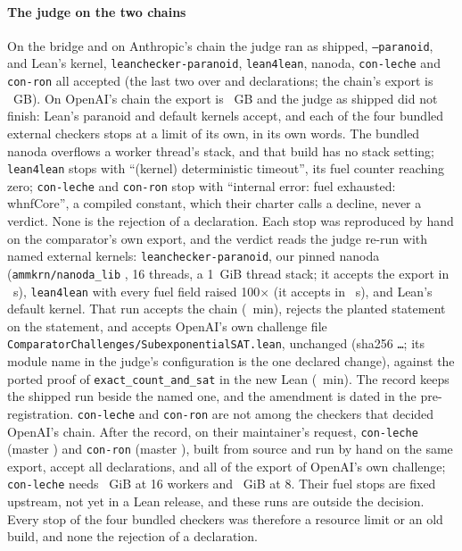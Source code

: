 \documentclass[preprint,11pt,authoryear,a4paper]{elsarticle}
\newcommand{\lean}[1]{\texttt{#1}}
\begin{document}
\paragraph{The judge on the two chains} On the bridge and on Anthropic's chain the judge ran as shipped, \lean{--paranoid}, and Lean's kernel, \lean{leanchecker-paranoid}, \lean{lean4lean}, nanoda, \lean{con-leche} and \lean{con-ron} all accepted (the last two over \EcCtwoJudgeDecls{} and \EcChainJudgeDecls{} declarations; the chain's export is \EcExportGb{}~GB). On OpenAI's chain the export is \EcOaExportGb{}~GB and the judge as shipped did not finish: Lean's paranoid and default kernels accept, and each of the four bundled external checkers stops at a limit of its own, in its own words. The bundled nanoda \EcOaBundledNanoda{} overflows a worker thread's stack, and that build has no stack setting; \lean{lean4lean} stops with ``(kernel) deterministic timeout'', its fuel counter reaching zero; \lean{con-leche} and \lean{con-ron} stop with ``internal error: fuel exhausted: whnfCore'', a compiled constant, which their charter calls a decline, never a verdict. None is the rejection of a declaration. Each stop was reproduced by hand on the comparator's own export, and the verdict reads the judge re-run with named external kernels: \lean{leanchecker-paranoid}, our pinned nanoda (\lean{ammkrn/nanoda\_lib} \EcPinnedNanoda, 16 threads, a 1~GiB thread stack; it accepts the export in \EcOaNanodaPinnedSec{}~s), \lean{lean4lean} with every fuel field raised 100$\times$ (it accepts in \EcOaLeanFourLeanFuelSec{}~s), and Lean's default kernel. That run accepts the chain (\EcOaJudgeMin{}~min), rejects the planted statement on the statement, and accepts OpenAI's own challenge file \lean{ComparatorChallenges/SubexponentialSAT.lean}, unchanged (sha256 \texttt{\EcOaChallengeSha\dots}; its module name in the judge's configuration is the one declared change), against the ported proof of \lean{exact\_count\_and\_sat} in the new Lean (\EcOaPthreeMin{}~min). The record keeps the shipped run beside the named one, and the amendment is dated in the pre-registration. \lean{con-leche} and \lean{con-ron} are not among the checkers that decided OpenAI's chain. After the record, on their maintainer's request, \lean{con-leche} (master \EcOaMastersLeche) and \lean{con-ron} (master \EcOaMastersRon), built from source and run by hand on the same export, accept all \EcOaMastersDecls{} declarations, and all \EcOaMastersChallengeDecls{} of the export of OpenAI's own challenge; \lean{con-leche} needs \EcOaLecheSixteenGib~GiB at 16 workers and \EcOaLecheEightGib~GiB at 8. Their fuel stops are fixed upstream, not yet in a Lean release, and these runs are outside the decision. Every stop of the four bundled checkers was therefore a resource limit or an old build, and none the rejection of a declaration.
\end{document}
